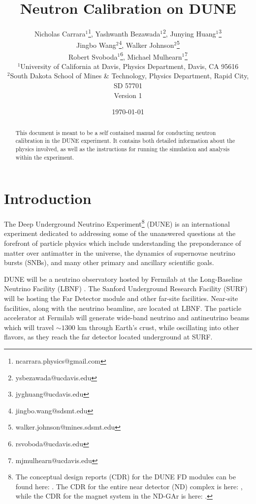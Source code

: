 \documentclass[8pt]{refart}
\title{Neutron Calibration on DUNE}
\author{Nicholas Carrara$^1$\thanks{ncarrara.physics@gmail.com}, Yashwanth Bezawada$^1$\thanks{ysbezawada@ucdavis.edu}, Junying Huang$^1$\thanks{jyghuang@ucdavis.edu}\\Jingbo Wang$^2$\thanks{jingbo.wang@sdsmt.edu}, Walker Johnson$^2$\thanks{walker.johnson@mines.sdsmt.edu}\\
Robert Svoboda$^1$\thanks{rsvoboda@ucdavis.edu}, Michael Mulhearn$^1$\thanks{mjmulhearn@ucdavis.edu}\\
${}^1$University of California at Davis, Physics Department, Davis, CA 95616\\
${}^2$South Dakota School of Mines \& Technology, Physics Department, Rapid City, SD 57701\\
Version 1}
\date{\today}
\begin{document}
\maketitle

\begin{abstract}
        This document is meant to be a self contained manual for conducting neutron calibration in the DUNE experiment.  It contains both detailed information about the physics involved, as well as the instructions for running the simulation and analysis within the experiment.
\end{abstract}


\tableofcontents
 
\newpage



\section{Introduction}

The Deep Underground Neutrino Experiment\footnote{The conceptual design reports (CDR) for the DUNE FD modules can be found here: \cite{DUNEFDCDR1,DUNEFDCDR2,DUNEFDCDR3,DUNEFDCDR4} .  The CDR for the entire near detector (ND) complex is here: \cite{DUNENDCDR}, while the CDR for the magnet system in the ND-GAr is here: \cite{DUNECDRMagnet}.} (DUNE) \cite{DUNETDR1,DUNETDR2,DUNETDR3,DUNETDR4} is an international experiment dedicated to addressing some of the unanswered questions at the forefront of particle physics which include understanding the preponderance of matter over antimatter in the universe, the dynamics of supernovae neutrino bursts (SNBs), and many other primary and ancillary scientific goals.

DUNE will be a neutrino observatory hosted by Fermilab \cite{Fermilab} at the Long-Baseline Neutrino Facility (LBNF) \cite{LBNF}. The Sanford Underground Research Facility (SURF) \cite{SURF} will be hosting the Far Detector module and other far-site facilities. Near-site facilities, along with the neutrino beamline, are located at LBNF. The particle accelerator at Fermilab will generate wide-band neutrino and antineutrino beams which will travel $\sim 1300$ km through Earth's crust, while oscillating into other flavors, as they reach the far detector located underground at SURF.

\end{document}
